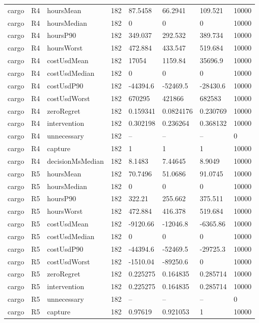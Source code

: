\begin{tabular}{llllllll}
cargo & R4 & hoursMean & 182 & 87.5458 & 66.2941 & 109.521 & 10000 \\
cargo & R4 & hoursMedian & 182 & 0 & 0 & 0 & 10000 \\
cargo & R4 & hoursP90 & 182 & 349.037 & 292.532 & 389.734 & 10000 \\
cargo & R4 & hoursWorst & 182 & 472.884 & 433.547 & 519.684 & 10000 \\
cargo & R4 & costUsdMean & 182 & 17054 & 1159.84 & 35696.9 & 10000 \\
cargo & R4 & costUsdMedian & 182 & 0 & 0 & 0 & 10000 \\
cargo & R4 & costUsdP90 & 182 & -44394.6 & -52469.5 & -28430.6 & 10000 \\
cargo & R4 & costUsdWorst & 182 & 670295 & 421866 & 682583 & 10000 \\
cargo & R4 & zeroRegret & 182 & 0.159341 & 0.0824176 & 0.230769 & 10000 \\
cargo & R4 & intervention & 182 & 0.302198 & 0.236264 & 0.368132 & 10000 \\
cargo & R4 & unnecessary & 182 & -- & -- & -- & 0 \\
cargo & R4 & capture & 182 & 1 & 1 & 1 & 10000 \\
cargo & R4 & decisionMsMedian & 182 & 8.1483 & 7.44645 & 8.9049 & 10000 \\
cargo & R5 & hoursMean & 182 & 70.7496 & 51.0686 & 91.0745 & 10000 \\
cargo & R5 & hoursMedian & 182 & 0 & 0 & 0 & 10000 \\
cargo & R5 & hoursP90 & 182 & 322.21 & 255.662 & 375.511 & 10000 \\
cargo & R5 & hoursWorst & 182 & 472.884 & 416.378 & 519.684 & 10000 \\
cargo & R5 & costUsdMean & 182 & -9120.66 & -12046.8 & -6365.86 & 10000 \\
cargo & R5 & costUsdMedian & 182 & 0 & 0 & 0 & 10000 \\
cargo & R5 & costUsdP90 & 182 & -44394.6 & -52469.5 & -29725.3 & 10000 \\
cargo & R5 & costUsdWorst & 182 & -1510.04 & -89250.6 & 0 & 10000 \\
cargo & R5 & zeroRegret & 182 & 0.225275 & 0.164835 & 0.285714 & 10000 \\
cargo & R5 & intervention & 182 & 0.225275 & 0.164835 & 0.285714 & 10000 \\
cargo & R5 & unnecessary & 182 & -- & -- & -- & 0 \\
cargo & R5 & capture & 182 & 0.97619 & 0.921053 & 1 & 10000 \\

\end{tabular}
